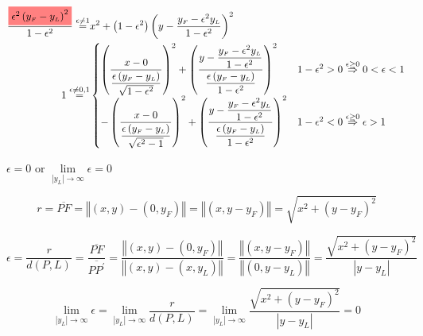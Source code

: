 \documentclass[
]{book}
\theoremstyle{definition}
\theoremstyle{definition}
\theoremstyle{definition}
\theoremstyle{definition}
\theoremstyle{remark}
\begin{document}
\[
\begin{aligned}
\dfrac{\colorbox{red!50}{\text{\ensuremath{\epsilon^{2}\left(y_{{\scriptscriptstyle F}}-y_{{\scriptscriptstyle L}}\right)^{2}}}}}{1-\epsilon^{2}}\overset{\epsilon\ne1}{=} & x^{2}+\left(1-\epsilon^{2}\right)\left(y-\dfrac{y_{{\scriptscriptstyle F}}-\epsilon^{2}y_{{\scriptscriptstyle L}}}{1-\epsilon^{2}}\right)^{2}\\
1\overset{\epsilon\ne0,1}{=} & \begin{cases}
\left(\dfrac{x-0}{\dfrac{\epsilon\left(y_{{\scriptscriptstyle F}}-y_{{\scriptscriptstyle L}}\right)}{\sqrt{1-\epsilon^{2}}}}\right)^{2}+\left(\dfrac{y-\dfrac{y_{{\scriptscriptstyle F}}-\epsilon^{2}y_{{\scriptscriptstyle L}}}{1-\epsilon^{2}}}{\dfrac{\epsilon\left(y_{{\scriptscriptstyle F}}-y_{{\scriptscriptstyle L}}\right)}{1-\epsilon^{2}}}\right)^{2} & 1-\epsilon^{2}>0\overset{\epsilon\ge0}{\Rightarrow}0<\epsilon<1\\
-\left(\dfrac{x-0}{\dfrac{\epsilon\left(y_{{\scriptscriptstyle F}}-y_{{\scriptscriptstyle L}}\right)}{\sqrt{\epsilon^{2}-1}}}\right)^{2}+\left(\dfrac{y-\dfrac{y_{{\scriptscriptstyle F}}-\epsilon^{2}y_{{\scriptscriptstyle L}}}{1-\epsilon^{2}}}{\dfrac{\epsilon\left(y_{{\scriptscriptstyle F}}-y_{{\scriptscriptstyle L}}\right)}{1-\epsilon^{2}}}\right)^{2} & 1-\epsilon^{2}<0\overset{\epsilon\ge0}{\Rightarrow}\epsilon>1
\end{cases}
\end{aligned}
\]

\(\epsilon=0\) or \(\lim\limits _{\left|y_{L}\right|\rightarrow\infty}\epsilon=0\)

\[
r=\overline{PF}=\left\Vert \left(x,y\right)-\left(0,y_{{\scriptscriptstyle F}}\right)\right\Vert =\left\Vert \left(x,y-y_{{\scriptscriptstyle F}}\right)\right\Vert =\sqrt{x^{2}+\left(y-y_{{\scriptscriptstyle F}}\right)^{2}}
\]

\[
\epsilon=\dfrac{r}{d\left(P,L\right)}=\dfrac{\overline{PF}}{\overline{PP^{\prime}}}=\dfrac{\left\Vert \left(x,y\right)-\left(0,y_{{\scriptscriptstyle F}}\right)\right\Vert }{\left\Vert \left(x,y\right)-\left(x,y_{{\scriptscriptstyle L}}\right)\right\Vert }=\dfrac{\left\Vert \left(x,y-y_{{\scriptscriptstyle F}}\right)\right\Vert }{\left\Vert \left(0,y-y_{{\scriptscriptstyle L}}\right)\right\Vert }=\dfrac{\sqrt{x^{2}+\left(y-y_{{\scriptscriptstyle F}}\right)^{2}}}{\left|y-y_{{\scriptscriptstyle L}}\right|}
\]

\[
\lim_{\left|y_{L}\right|\rightarrow\infty}\epsilon=\lim_{\left|y_{L}\right|\rightarrow\infty}\dfrac{r}{d\left(P,L\right)}=\lim_{\left|y_{L}\right|\rightarrow\infty}\dfrac{\sqrt{x^{2}+\left(y-y_{{\scriptscriptstyle F}}\right)^{2}}}{\left|y-y_{{\scriptscriptstyle L}}\right|}=0
\]
\end{document}
